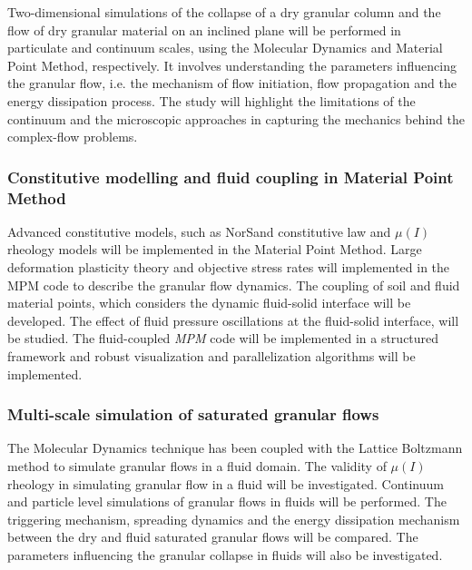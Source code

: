 Two-dimensional simulations of the collapse of a dry granular column and the 
flow of dry granular material on an inclined plane will be performed in 
particulate and continuum scales, using the Molecular Dynamics and Material 
Point Method, respectively. It involves understanding the parameters 
influencing the granular flow, i.e. the mechanism of flow initiation, flow 
propagation and the energy dissipation process. The study will highlight the 
limitations of the continuum and the microscopic approaches in capturing the 
mechanics behind the complex-flow problems.

\tochide\subsubsection{Constitutive modelling and fluid coupling in Material 
Point Method}

Advanced constitutive models, such as NorSand constitutive law and 
$\mu\left(\textit{I}\right)$ rheology models will be implemented in the 
Material Point Method. Large deformation plasticity theory and objective stress 
rates will implemented in the MPM code to describe the granular flow dynamics. 
The coupling of soil and fluid material points, which considers the dynamic 
fluid-solid interface will be developed. The effect of fluid pressure 
oscillations at the fluid-solid interface, will be studied. The fluid-coupled 
\textit{MPM} code will be implemented in a structured framework and robust 
visualization and parallelization algorithms will be implemented.

\tochide\subsubsection{Multi-scale simulation of saturated granular flows}

The Molecular Dynamics technique has been coupled with the Lattice Boltzmann 
method to simulate granular flows in a fluid domain. The validity of 
$\mu\left(\textit{I}\right)$ rheology in simulating granular flow in a fluid 
will be investigated. Continuum and particle level simulations of granular 
flows in fluids will be performed. The triggering mechanism, spreading dynamics 
and the energy dissipation mechanism between the dry and fluid saturated 
granular flows will be compared. The parameters influencing the granular 
collapse in fluids will also be investigated. 

